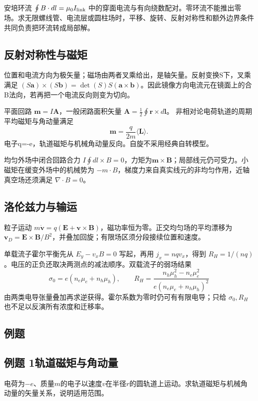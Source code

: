 \documentclass[UTF8,fontset=fandol,zihao=-4,a4paper]{ctexart}
\newcommand{\Worked}[2]{\needspace{85mm}\subsection*{例题 #1\quad #2}}
\begin{document}
安培环流 \(\oint B\cdot dl=\mu_0I_{\rm link}\) 中的穿面电流与有向绕数配对。零环流不能推出零场。求无限螺线管、电流层或圆柱场时，平移、旋转、反射对称性和额外边界条件共同负责把环流转成局部解。

\subsection{反射对称性与磁矩}
位置和电流方向为极矢量；磁场由两者叉乘给出，是轴矢量。反射变换S下，叉乘满足 \((S\boldsymbol a)\times(S\boldsymbol b)=\det(S)S(\boldsymbol a\times\boldsymbol b)\)。因此镜像方向电流元在镜面上的合B法向，若再把一个电流反向则变为切向。

平面回路 \(\boldsymbol m=I\boldsymbol A\)，一般闭路面积矢量
\(\boldsymbol A=\frac12\oint\boldsymbol r\times d\boldsymbol l\)。
非相对论电荷轨道的周期平均磁矩与角动量满足
\[
\boldsymbol m=\frac{q}{2m}\langle\boldsymbol L\rangle.
\]
电子q=-e，轨道磁矩与机械角动量反向。自旋不采用经典自转模型。

均匀外场中闭合回路合力 \(I\oint dl\times B=0\)，力矩为\(\boldsymbol m\times\boldsymbol B\)；局部线元仍可受力。小磁矩在缓变外场中的机械势为 \(-m\cdot B\)，梯度力来自真实线元的非均匀作用，近轴真空场还须满足 \(\nabla\cdot B=0\)。

\subsection{洛伦兹力与输运}
粒子运动 \(m\dot{\boldsymbol v}=q(\boldsymbol E+\boldsymbol v\times\boldsymbol B)\)，磁功率恒为零。正交均匀场的平均漂移为 \(\boldsymbol v_D=\boldsymbol E\times\boldsymbol B/B^2\)，并叠加回旋；有限场区须分段接续位置和速度。

单载流子霍尔平衡先从 \(E_y-v_xB=0\) 写起，再用 \(j_x=nqv_x\)，得到 \(R_H=1/(nq)\)。电压的正负还取决两测点的减法顺序。双载流子的弱场结果
\[
\sigma_0=e(n_e\mu_e+n_h\mu_h),\qquad
R_H=\frac{n_h\mu_h^2-n_e\mu_e^2}
{e(n_e\mu_e+n_h\mu_h)^2}
\]
由两类电导张量叠加再求逆获得。霍尔系数为零时仍可有有限电导；只给 \(\sigma_0,R_H\) 也不足以反演所有浓度和迁移率。


\needspace{110mm}

\subsection*{例题}

\Worked{1}{轨道磁矩与角动量}

电荷为\(-e\)、质量\(m\)的电子以速度\(v\)在半径\(r\)的圆轨道上运动。求轨道磁矩与机械角动量的矢量关系，说明适用范围。
\end{document}
